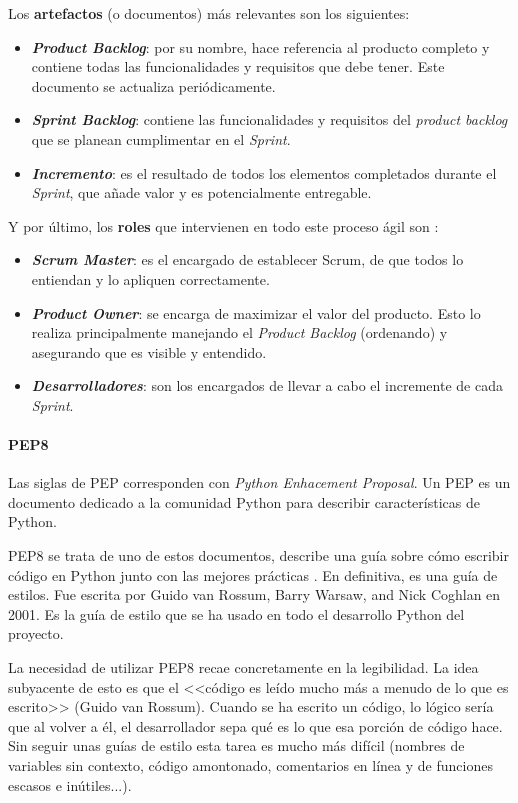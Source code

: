 Los \textbf{artefactos} (o documentos) más relevantes son los siguientes:
\begin{itemize}
	\item \textbf{\textit{Product Backlog}}: por su nombre, hace referencia al
	producto completo y contiene todas las funcionalidades y requisitos que debe
	tener. Este documento se actualiza periódicamente.
	\item \textbf{\textit{Sprint Backlog}}: contiene las funcionalidades y
	requisitos del \textit{product backlog} que se planean cumplimentar en el
	\textit{Sprint}.
	\item \textbf{\textit{Incremento}}: es el resultado de todos los elementos
	completados durante el \textit{Sprint}, que añade valor y es potencialmente
	entregable.
\end{itemize}

Y por último, los \textbf{roles} que intervienen en todo este proceso ágil son
\cite{scrum:team}:
\begin{itemize}
	\item \textbf{\textit{Scrum Master}}: es el encargado de establecer Scrum,
	de que todos lo entiendan y lo apliquen correctamente.
	\item \textbf{\textit{Product Owner}}: se encarga de maximizar el valor del
	producto. Esto lo realiza principalmente manejando el \textit{Product
	Backlog} (ordenando) y asegurando que es visible y entendido.
	\item \textbf{\textit{Desarrolladores}}: son los encargados de llevar a cabo
	el incremente de cada \textit{Sprint}.
\end{itemize}


\paragraph{PEP8} Las siglas de PEP corresponden con \textit{Python Enhacement
Proposal}. Un PEP es un documento dedicado a la comunidad Python para describir
características de Python.

PEP8 se trata de uno de estos documentos, describe una guía sobre cómo escribir
código en Python junto con las mejores prácticas \cite{pep8:desc}. En
definitiva, es una guía de estilos. Fue escrita por Guido van Rossum, Barry
Warsaw, and Nick Coghlan en 2001. Es la guía de estilo que se ha usado en todo
el desarrollo Python del proyecto.

La necesidad de utilizar PEP8 recae concretamente en la legibilidad. La idea
subyacente de esto es que el <<código es leído mucho más a menudo de lo que es
escrito>> (Guido van Rossum). Cuando se ha escrito un código, lo lógico sería
que al volver a él, el desarrollador sepa qué es lo que esa porción de código
hace. Sin seguir unas guías de estilo esta tarea es mucho más difícil (nombres
de variables sin contexto, código amontonado, comentarios en línea y de
funciones escasos e inútiles...).


